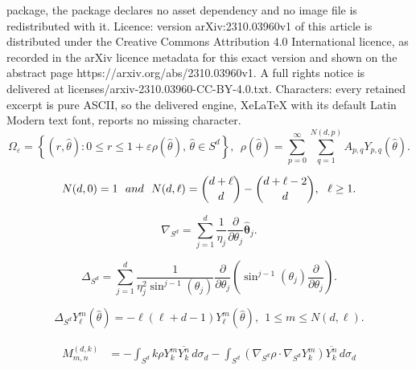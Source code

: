 \documentclass[10pt,a4paper]{amsart}
\newcommand{\cc}{\overline}
\newcommand{\del}{\partial}
\newcommand{\tn}{\textnormal}
\newcommand{\vareps}{\varepsilon}
\renewcommand{\vec}[1]{\hat{\boldsymbol{#1}}}
\begin{document}
package, the package declares no asset dependency and no image file is redistributed with it. Licence: version arXiv:2310.03960v1 of this article is distributed under the Creative Commons Attribution 4.0 International licence, as recorded in the arXiv licence metadata for this exact version and shown on the abstract page https://arxiv.org/abs/2310.03960v1. A full rights notice is delivered at licenses/arxiv-2310.03960-CC-BY-4.0.txt. Characters: every retained excerpt is pure ASCII, so the delivered engine, XeLaTeX with its default Latin Modern text font, reports no missing character.
\begin{equation} \label{eq:Domain} 
\Omega_\vareps = \left\{(r, \hat\theta): 0\le r\le 1+ \vareps\rho(\hat\theta), \, \hat\theta \in S^d \right\}, \ \ \rho(\hat\theta) = \sum_{p = 0}^\infty\sum_{q = 1}^{N(d, p)} A_{p, q} Y_{p, q}(\hat\theta). 
\end{equation} 

\begin{equation} \label{eq:Steklov_multiplicity} 
N(d, 0) = 1 \ \ \tn{ and } \ \ N(d, \ell) = \binom{d + \ell}{d} - \binom{d + \ell - 2}{d}, \ \ \ell\ge 1. 
\end{equation} 

\begin{equation} \label{eq:SCgrad} 
\nabla_{S^d} = \sum_{j = 1}^d \frac{1}{\eta_j}\frac{\del}{\del\theta_j}\vec{\theta}_j. 
\end{equation} 

\begin{equation} \label{eq:SCbeltrami} 
\Delta_{S^d} = \sum_{j = 1}^d \frac{1}{\eta_j^2\sin^{j - 1}(\theta_j)}\frac{\del}{\del\theta_j}\left(\sin^{j - 1}(\theta_j)\frac{\del}{\del\theta_j}\right). 
\end{equation} 

\begin{equation} \label{eq:SH_eigs} 
\Delta_{S^d}Y_\ell^m(\hat\theta) = -\ell(\ell + d - 1)Y_\ell^m(\hat\theta), \ \ 1\le m\le N(d, \ell). 
\end{equation} 

\begin{gather} \label{eq:Oeps_matrix}
\begin{aligned}  
M_{m, n}^{(d, k)} & = -\int_{S^d} k\rho Y_k^m\cc{Y_k^n}\, d\sigma_d - \int_{S^d} \left(\nabla_{S^d}\rho\cdot \nabla_{S^d}Y_k^m\right)\cc{Y_k^n}\, d\sigma_d \\ 
\end{aligned} 
\end{gather} 
\end{document}
